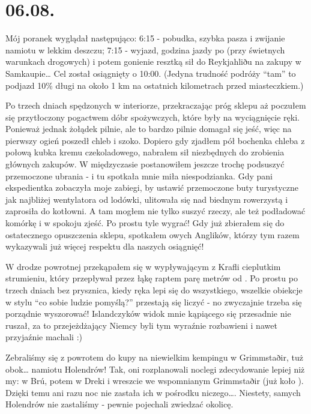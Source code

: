 \chapter{06.08.}

Mój poranek wyglądał następująco: 6:15 - pobudka, szybka pasza i zwijanie namiotu w lekkim deszczu; 7:15 - wyjazd, godzina jazdy po  (przy świetnych warunkach drogowych) i potem gonienie resztką sił do Reykjahliðu na zakupy w Samkaupie… Cel został osiągnięty o 10:00. (Jedyna trudność podróży “tam” to podjazd 10\% długi na około 1 km na ostatnich kilometrach przed miasteczkiem.)

Po trzech dniach spędzonych w interiorze, przekraczając próg sklepu aż poczułem się przytłoczony pogactwem dóbr spożywczych, które były na wyciągnięcie ręki. Ponieważ jednak żołądek pilnie, ale to bardzo pilnie domagał się jeść, więc na pierwszy ogień poszedł chleb i szoko. Dopiero gdy zjadłem pół bochenka chleba z połową kubka kremu czekoladowego, nabrałem sił niezbędnych do zrobienia głównych zakupów. W międzyczasie postanowiłem jeszcze trochę podsuszyć przemoczone ubrania - i tu spotkała mnie miła niespodzianka. Gdy pani ekspedientka zobaczyła moje zabiegi, by ustawić przemoczone buty turystyczne jak najbliżej wentylatora od lodówki, ulitowała się nad biednym rowerzystą i zaprosiła do kotłowni. A tam mogłem nie tylko suszyć rzeczy, ale też podładować komórkę i w spokoju zjeść. Po prostu tyle wygrać! Gdy już zbierałem się do ostatecznego opuszczenia sklepu, spotkałem owych Anglików, którzy tym razem wykazywali już więcej respektu dla naszych osiągnięć!

W drodze powrotnej przekąpałem się w wypływającym z Krafli cieplutkim strumieniu, który przepływał przez łąkę raptem parę metrów od . Po prostu po trzech dniach bez prysznica, kiedy ręka lepi się do wszystkiego, wszelkie obiekcje w stylu “co sobie ludzie pomyślą?” przestają się liczyć - no zwyczajnie trzeba się porządnie wyszorować! Islandczyków widok mnie kąpiącego się przesadnie nie ruszał, za to przejeżdżający Niemcy byli tym wyraźnie rozbawieni i nawet przyjaźnie machali :)

Zebraliśmy się z powrotem do kupy na niewielkim kempingu w Grimmstaðir, tuż obok… namiotu Holendrów! Tak, oni rozplanowali noclegi zdecydowanie lepiej niż my: w Brú, potem w Dreki i wreszcie we wspomnianym Grimmstaðir (już koło ). Dzięki temu ani razu noc nie zastała ich w pośrodku niczego…. Niestety, samych Holendrów nie zastaliśmy - pewnie pojechali zwiedzać okolicę.

